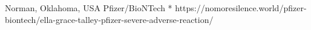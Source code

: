           {
            Norman, Oklahoma, USA
          }
          {
          }
          {
            Pfizer/BioNTech
          }
          {
            *
          }
          {
          }
          {
            https://nomoresilence.world/pfizer-biontech/ella-grace-talley-pfizer-severe-adverse-reaction/
          }

